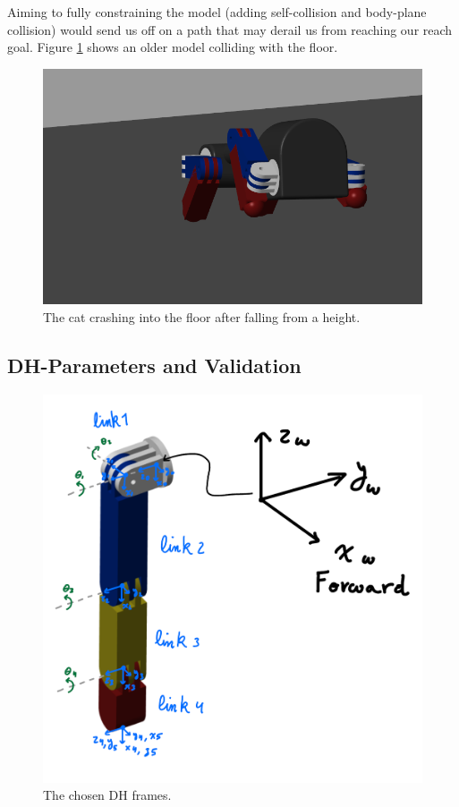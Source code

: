 Aiming to fully constraining the model (adding self-collision and body-plane collision) would send us off on a path that may derail us from reaching our reach goal. Figure \ref{fig:collision} shows an older model colliding with the floor.
\begin{figure}[thpb]
    \parbox{\linewidth}{\includegraphics[width=\linewidth]{Figures/ContactModel.png}}
    \caption{The cat crashing into the floor after falling from a height.}
    \label{fig:collision}
\end{figure}

\subsection{DH-Parameters and Validation} \label{sec:dhparams}
\begin{figure}[thpb]
    \parbox{\linewidth}{\includegraphics[width=\linewidth]{Figures/dhframes.png}}
    \caption{The chosen DH frames.}
    \label{fig:dhframes}
\end{figure}

